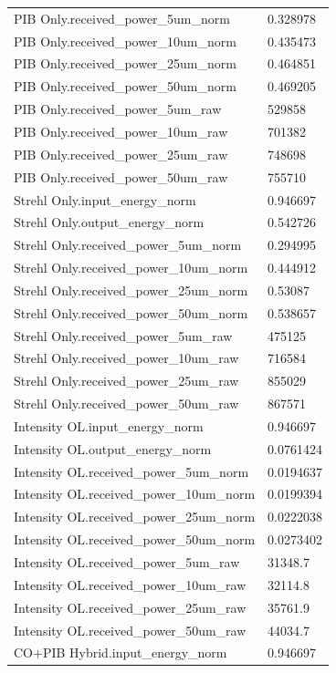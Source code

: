 \begin{longtable}{p{}p{}}
PIB Only.received\_power\_5um\_norm & 0.328978\\
PIB Only.received\_power\_10um\_norm & 0.435473\\
PIB Only.received\_power\_25um\_norm & 0.464851\\
PIB Only.received\_power\_50um\_norm & 0.469205\\
PIB Only.received\_power\_5um\_raw & 529858\\
PIB Only.received\_power\_10um\_raw & 701382\\
PIB Only.received\_power\_25um\_raw & 748698\\
PIB Only.received\_power\_50um\_raw & 755710\\
Strehl Only.input\_energy\_norm & 0.946697\\
Strehl Only.output\_energy\_norm & 0.542726\\
Strehl Only.received\_power\_5um\_norm & 0.294995\\
Strehl Only.received\_power\_10um\_norm & 0.444912\\
Strehl Only.received\_power\_25um\_norm & 0.53087\\
Strehl Only.received\_power\_50um\_norm & 0.538657\\
Strehl Only.received\_power\_5um\_raw & 475125\\
Strehl Only.received\_power\_10um\_raw & 716584\\
Strehl Only.received\_power\_25um\_raw & 855029\\
Strehl Only.received\_power\_50um\_raw & 867571\\
Intensity OL.input\_energy\_norm & 0.946697\\
Intensity OL.output\_energy\_norm & 0.0761424\\
Intensity OL.received\_power\_5um\_norm & 0.0194637\\
Intensity OL.received\_power\_10um\_norm & 0.0199394\\
Intensity OL.received\_power\_25um\_norm & 0.0222038\\
Intensity OL.received\_power\_50um\_norm & 0.0273402\\
Intensity OL.received\_power\_5um\_raw & 31348.7\\
Intensity OL.received\_power\_10um\_raw & 32114.8\\
Intensity OL.received\_power\_25um\_raw & 35761.9\\
Intensity OL.received\_power\_50um\_raw & 44034.7\\
CO+PIB Hybrid.input\_energy\_norm & 0.946697\\

\end{longtable}
